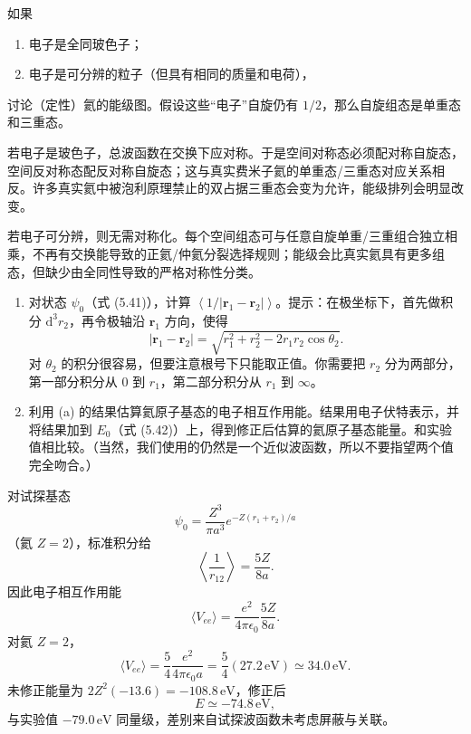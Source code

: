 \begin{question}
如果
\begin{enumerate}
\item 电子是全同玻色子；
\item 电子是可分辨的粒子（但具有相同的质量和电荷），
\end{enumerate}
讨论（定性）氦的能级图。假设这些“电子”自旋仍有 $1/2$，那么自旋组态是单重态和三重态。
\end{question}
\begin{solution}

若电子是玻色子，总波函数在交换下应对称。于是空间对称态必须配对称自旋态，空间反对称态配反对称自旋态；这与真实费米子氦的单重态/三重态对应关系相反。许多真实氦中被泡利原理禁止的双占据三重态会变为允许，能级排列会明显改变。

若电子可分辨，则无需对称化。每个空间组态可与任意自旋单重/三重组合独立相乘，不再有交换能导致的正氦/仲氦分裂选择规则；能级会比真实氦具有更多组态，但缺少由全同性导致的严格对称性分类。

\end{solution}

\begin{question}
\begin{enumerate}
\item 对状态 $\psi_0$（式 (5.41)），计算 $\left\langle 1/|\mathbf r_1-\mathbf r_2|\right\rangle$。提示：在极坐标下，首先做积分 $\mathrm d^3r_2$，再令极轴沿 $\mathbf r_1$ 方向，使得
\[
|\mathbf r_1-\mathbf r_2|=\sqrt{r_1^2+r_2^2-2r_1r_2\cos\theta_2}.
\]
对 $\theta_2$ 的积分很容易，但要注意根号下只能取正值。你需要把 $r_2$ 分为两部分，第一部分积分从 $0$ 到 $r_1$，第二部分积分从 $r_1$ 到 $\infty$。
\item 利用 (a) 的结果估算氦原子基态的电子相互作用能。结果用电子伏特表示，并将结果加到 $E_0$（式 (5.42)）上，得到修正后估算的氦原子基态能量。和实验值相比较。（当然，我们使用的仍然是一个近似波函数，所以不要指望两个值完全吻合。）
\end{enumerate}

\par\smallskip
{}

\end{question}
\begin{solution}

对试探基态
\[
\psi_0=\frac{Z^3}{\pi a^3}e^{-Z(r_1+r_2)/a}
\]
（氦 $Z=2$），标准积分给
\[
\left\langle\frac1{r_{12}}\right\rangle=\frac{5Z}{8a}.
\]
因此电子相互作用能
\[
\langle V_{ee}\rangle=\frac{e^2}{4\pi\epsilon_0}\frac{5Z}{8a}.
\]
对氦 $Z=2$，
\[
\langle V_{ee}\rangle=\frac54\frac{e^2}{4\pi\epsilon_0a}=\frac54(27.2\,\mathrm{eV})\simeq34.0\,\mathrm{eV}.
\]
未修正能量为 $2Z^2(-13.6)=-108.8\,\mathrm{eV}$，修正后
\[
E\simeq -74.8\,\mathrm{eV},
\]
与实验值 $-79.0\,\mathrm{eV}$ 同量级，差别来自试探波函数未考虑屏蔽与关联。

\end{solution}

